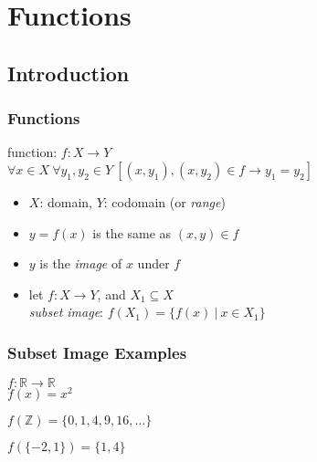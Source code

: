 \documentclass[dvipsnames]{beamer}
\begin{document}
\section{Functions}

\subsection{Introduction}

\begin{frame}
  \frametitle{Functions}

  \begin{definition}
    \alert{function}: $f: X \rightarrow Y$\\
    $\forall x \in X~\forall y_1,y_2 \in Y~
      [(x,y_1),(x,y_2) \in f \rightarrow y_1=y_2]$
  \end{definition}

  \medskip
  \begin{itemize}
    \item $X$: \alert{domain}, $Y$: \alert{codomain} (or \emph{range})

    \pause
    \medskip
    \item $y = f(x)$ is the same as $(x,y) \in f$
    \item $y$ is the \emph{image} of $x$ under $f$

    \pause
    \medskip
    \item let $f: X \rightarrow Y$, and $X_1 \subseteq X$\\
      \emph{subset image}: $f(X_1) = \{f(x)~|~x \in X_1\}$
 \end{itemize}
\end{frame}

\begin{frame}
  \frametitle{Subset Image Examples}

  \begin{example}
    $f: \mathbb{R} \rightarrow \mathbb{R}$\\
    $f(x) = x^2$

    \pause
    \bigskip
    $f(\mathbb{Z}) = \{0,1,4,9,16,\dots\}$

    \medskip
    $f(\{-2,1\}) = \{1,4\}$
  \end{example}
\end{frame}
\end{document}
